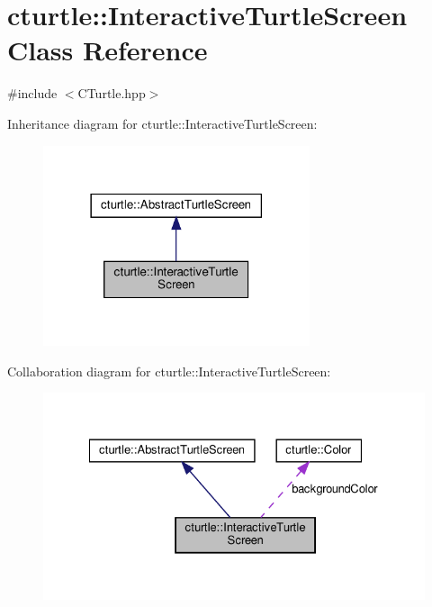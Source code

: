 \hypertarget{classcturtle_1_1InteractiveTurtleScreen}{}\section{cturtle\+:\+:Interactive\+Turtle\+Screen Class Reference}
\label{classcturtle_1_1InteractiveTurtleScreen}


{\ttfamily \#include $<$C\+Turtle.\+hpp$>$}



Inheritance diagram for cturtle\+:\+:Interactive\+Turtle\+Screen\+:\nopagebreak
\begin{figure}[H]
\begin{center}
\leavevmode
\includegraphics[width=222pt]{classcturtle_1_1InteractiveTurtleScreen__inherit__graph}
\end{center}
\end{figure}


Collaboration diagram for cturtle\+:\+:Interactive\+Turtle\+Screen\+:\nopagebreak
\begin{figure}[H]
\begin{center}
\leavevmode
\includegraphics[width=328pt]{classcturtle_1_1InteractiveTurtleScreen__coll__graph}
\end{center}
\end{figure}
